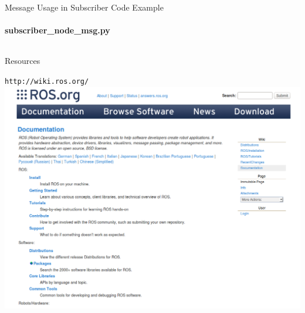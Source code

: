 \documentclass[aspectratio=43]{beamer}
\newcommand{\inline}[1]{\texttt{#1}}
\begin{document}
\begin{frame}{Message Usage in Subscriber Code Example}
	\framesubtitle{subscriber\_node\_msg.py}
	\inputminted{python}{snippet/subscriber_node_msg.py}
\end{frame}


\begin{frame}{Resources}
	\begin{center}
	\inline{http://wiki.ros.org/}\\
	\includegraphics[width=\textwidth,keepaspectratio]{fig/ros_wiki.png}
	\end{center}
\end{frame}
\end{document}
